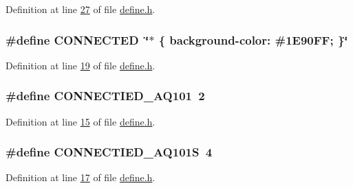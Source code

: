 Definition at line \hyperlink{a00034_source_l00027}{27} of file \hyperlink{a00034_source}{define.\+h}.

\hypertarget{a00034_af6202935c026af12978d46a765dafb90}{
\subsubsection[{C\+O\+N\+N\+E\+C\+T\+E\+D}]{\setlength{\rightskip}{0pt plus 5cm}\#define C\+O\+N\+N\+E\+C\+T\+E\+D~\char`\"{}$\ast$ \{ background-\/color\+: \#1\+E90\+F\+F; \}\char`\"{}}}\label{a00034_af6202935c026af12978d46a765dafb90}


Definition at line \hyperlink{a00034_source_l00019}{19} of file \hyperlink{a00034_source}{define.\+h}.

\hypertarget{a00034_ad3f30e8f0d6d166c560d596099924b1e}{
\subsubsection[{C\+O\+N\+N\+E\+C\+T\+I\+E\+D\+\_\+\+A\+Q101}]{\setlength{\rightskip}{0pt plus 5cm}\#define C\+O\+N\+N\+E\+C\+T\+I\+E\+D\+\_\+\+A\+Q101~2}}\label{a00034_ad3f30e8f0d6d166c560d596099924b1e}


Definition at line \hyperlink{a00034_source_l00015}{15} of file \hyperlink{a00034_source}{define.\+h}.

\hypertarget{a00034_ae5b15774e72547513ead1cbc9735b68d}{
\subsubsection[{C\+O\+N\+N\+E\+C\+T\+I\+E\+D\+\_\+\+A\+Q101\+S}]{\setlength{\rightskip}{0pt plus 5cm}\#define C\+O\+N\+N\+E\+C\+T\+I\+E\+D\+\_\+\+A\+Q101\+S~4}}\label{a00034_ae5b15774e72547513ead1cbc9735b68d}


Definition at line \hyperlink{a00034_source_l00017}{17} of file \hyperlink{a00034_source}{define.\+h}.

